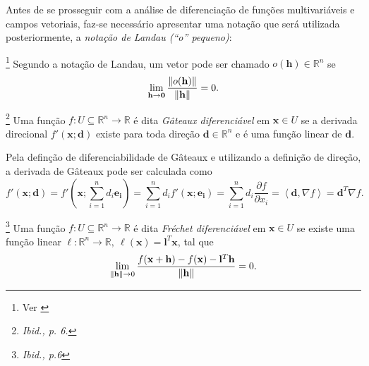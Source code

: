 Antes de se prosseguir com a an\'{a}lise de diferencia\c{c}\~{a}o de fun\c{c}\~{o}es multivari\'{a}veis e campos vetoriais, faz-se necess\'{a}rio apresentar uma nota\c{c}\~{a}o que ser\'{a} utilizada posteriormente, a \textit{nota\c{c}\~{a}o de Landau (``o'' pequeno)}:

\begin{definition}\footnote{Ver \cite[p. 6]{guller}}
Segundo a nota\c{c}\~{a}o de Landau, um vetor pode ser chamado $o(\mathbf{h}) \in \mathbb{R}^{n}$ se
\begin{equation*}
\lim_{\mathbf{h} \to \mathbf{0}} \frac{\left\lVert o(\mathbf{h})\right\rVert}{\left\lVert\mathbf{h}\right\rVert} = 0.
\end{equation*}
\end{definition}

\begin{definition}\label{gateauxDef}\footnote{\textit{Ibid., p. 6.}}
Uma fun\c{c}\~{a}o $f: U \subseteq \mathbb{R}^{n} \to \mathbb{R}$ \'{e} dita \textit{G\^{a}teaux diferenci\'{a}vel} em $\mathbf{x} \in U$ se a derivada direcional $f'(\mathbf{x};\mathbf{d})$ existe para toda dire\c{c}\~{a}o $\mathbf{d} \in \mathbb{R}^{n}$ e \'{e} uma fun\c{c}\~{a}o linear de $\mathbf{d}$.
\end{definition}

Pela defin\c{c}\~{a}o de diferenciabilidade de G\^{a}teaux e utilizando a defini\c{c}\~{a}o de dire\c{c}\~{a}o, a derivada de G\^{a}teaux pode ser calculada como
\begin{equation}\label{gateauxCalc}
f'(\mathbf{x};\mathbf{d}) = f'(\mathbf{x};\sum_{i=1}^{n}d_i\mathbf{e_i}) = \sum_{i=1}^{n} d_i f'(\mathbf{x};\mathbf{e_i}) = \sum_{i = 1}^{n} d_i \frac{\partial f}{\partial x_i} = \left\langle \mathbf{d},\nabla f \right\rangle = \mathbf{d}^T \nabla f.
\end{equation}

\begin{definition}\label{frechetDef}\footnote{\textit{Ibid., p.6}}
Uma fun\c{c}\~{a}o $f: U \subseteq \mathbb{R}^{n} \to \mathbb{R}$ \'{e} dita \textit{Fr\'{e}chet diferenci\'{a}vel} em $\mathbf{x} \in U$ se existe uma fun\c{c}\~{a}o linear $\ell: \mathbb{R}^{n} \to \mathbb{R},~\ell(\mathbf{x}) = \mathbf{l}^T\mathbf{x}$, tal que
\begin{equation*}
\lim_{\left\lVert\mathbf{h}\right\rVert \to 0} \frac{f(\mathbf{x} + \mathbf{h}) - f(\mathbf{x}) - \mathbf{l}^T\mathbf{h}}{\left\lVert\mathbf{h}\right\rVert} = 0.
\end{equation*}
\end{definition}

